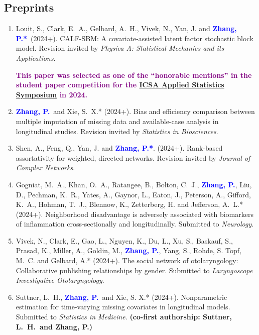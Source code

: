 \documentclass[12pt]{article}
\newcommand{\PZ}{\textcolor{blue}{\textbf{Zhang, P.*}}}
\newcommand{\PZnot}{\textcolor{blue}{\textbf{Zhang, P.}}}
\newcommand{\purple}[1]{\textcolor{purple}{#1}}
\begin{document}
	\subsection*{Preprints}
	\begin{enumerate}					
		\item {\sc Louit, S., Clark, E.\ A., Gelbard, A.\ H., Vivek, 
		N., Yan, J.} and \PZ\ (2024+). CALF-SBM: A 
		covariate-assisted latent factor stochastic block model. 
		Revision invited by {\em Physica A: Statistical Mechanics 
		and its Applications}.
		
		\purple{\bf This paper was selected as one of the 
		``honorable mentions'' in the student paper competition for 
		the 
		\href{https://symposium2024.icsa.org/student-paper-winners/}{ICSA
		 Applied Statistics Symposium} in 2024.}
	 
	 	\item \PZnot\ and {\sc Xie, S.\ X.*} (2024+). Bias 
	 	and efficiency comparison between multiple imputation of 
	 	missing data and available-case analysis in longitudinal 
	 	studies. Revision invited by {\em Statistics in Biosciences}.
	 	
	 	\item {\sc Shen, A., Feng, Q., Yan, J.} and \PZ. (2024+). 
	 	Rank-based assortativity for weighted, directed networks. 
	 	Revision invited by {\em Journal of Complex Networks}.
		
		\item {\sc Gogniat, M.\ A., Khan, O.\ A., Ratangee, B., 
		Bolton, C.\ J.,} \PZnot, {\sc Liu, D., Pechman, K.\ R., 
		Yates, A., Gaynor, L., Eaton, J., Peterson, A., Gifford, K.\ 
		A., Hohman, T.\ J., Blennow, K., Zetterberg, H.} and {\sc 
		Jefferson, A.\ L.*} (2024+). Neighborhood disadvantage is 
		adversely associated with biomarkers of inflammation 
		cross-sectionally and longitudinally. Submitted to {\em 
		Neurology}.
		
		\item {\sc Vivek, N., Clark, E., Gao, L., Nguyen, K., Du, 
		L., Xu, S., Baskauf, S., Prasad, K., Miller, A., Goldin, 
		M.,} \PZnot, {\sc Yang, S., Rohde, S. Topf, M.\ C.} and {\sc 
		Gelbard, A.*} (2024+). The social network of otolaryngology: 
		Collaborative publishing relationships by gender. Submitted 
		to {\em Laryngoscope Investigative Otolaryngology}.
					
		\item {\sc Suttner, L.\ H.,} \PZnot\ and {\sc Xie, S. X.*} 
		(2024+). Nonparametric estimation for time-varying missing 
		covariates in longitudinal models. Submitted to {\em 
		Statistics in Medicine}. {\bf (co-first authorship: Suttner, 
		L.\ H.\ and Zhang, P.)}
	

\end{enumerate}
\end{document}
